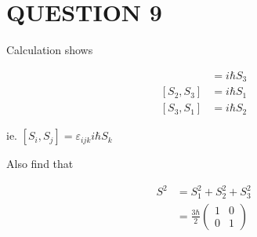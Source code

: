 \documentclass[a4paper]{article}
\begin{document}
\section{QUESTION 9}

Calculation shows

\begin{align*}
[S_{1},S_{2}]& = i \hbar S_{3} \\ 
[S_{2},S_{3}]& = i \hbar S_{1} \\ 
[S_{3},S_{1}]& = i \hbar S_{2}
\end{align*}

ie. $ [S_{i},S_{j}] = \varepsilon_{ijk} i\hbar S_{k} $

Also find that

\begin{align*}
S^{2} & = S_{1}^{2}  + S_{2}^{2} + S_{3}^{2} \\
& = \frac{3 \hbar}{2} \begin{pmatrix}
1 & 0 \\
0 & 1
\end{pmatrix}
\end{align*}
\end{document}
